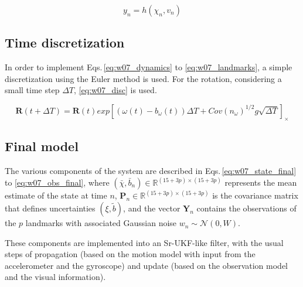 \documentclass[10pt,twocolumn]{IEEEtran}
\begin{document}
\begin{equation}
    \label{eq:w07_h}
    y_n = h\left( \chi_n, v_n \right)
\end{equation}

\subsection{Time discretization}

In order to implement Eqs.\,\eqref{eq:w07_dynamics} to \eqref{eq:w07_landmarks}, a simple discretization using the Euler method is used. For the rotation, considering a small time step $\Delta T$, \eqref{eq:w07_disc} is used.

\begin{equation}
    \label{eq:w07_disc}
    \mathbf{R}\left( t+\Delta T \right) = \mathbf{R}(t)exp\left[ \left( \omega(t) - b_\omega(t) \right) \Delta T + Cov(n_\omega)^{1/2} g \sqrt{\Delta T}\right]_\times
\end{equation}

\subsection{Final model}

The various components of the system are described in Eqs.\,\eqref{eq:w07_state_final} to \eqref{eq:w07_obs_final}, where $\left( \bar{\chi}, \bar{b}_n \right) \in \mathbb{R}^{(15+3p)\times(15+3p)}$ represents the mean estimate of the state at time $n$, $\mathbf{P}_n \in \mathbb{R}^{(15+3p)\times(15+3p)}$ is the covariance matrix that defines uncertainties $\left( \xi, \tilde{b} \right)$, and the vector $\mathbf{Y}_n$ contains the observations of the $p$ landmarks with associated Gaussian noise $w_n\sim \mathcal{N}(0,W)$. 

These components are implemented into an Sr-UKF-like filter, with the usual steps of propagation (based on the motion model with input from the accelerometer and the gyroscope) and update (based on the observation model and the visual information). 
\end{document}

